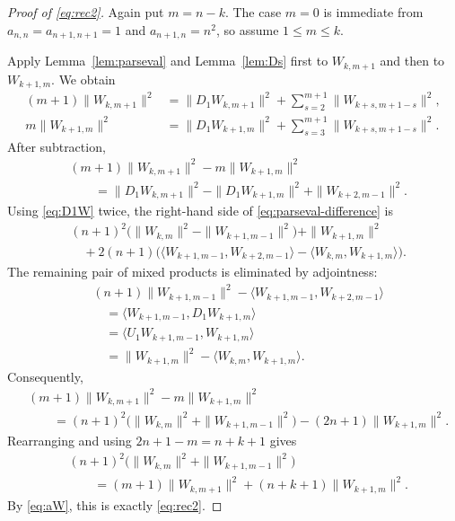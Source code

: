 \documentclass[a4paper,draft]{amsart}
\begin{document}
\begin{proof}[Proof of \eqref{eq:rec2}]
Again put $m=n-k$.  The case $m=0$ is immediate from
$a_{n,n}=a_{n+1,n+1}=1$ and $a_{n+1,n}=n^2$, so assume
$1\leq m\leq k$.

Apply Lemma~\ref{lem:parseval} and Lemma~\ref{lem:Ds} first to
$W_{k,m+1}$ and then to $W_{k+1,m}$.  We obtain
\begin{align*}
(m+1)\|W_{k,m+1}\|^2
 &=\|D_1W_{k,m+1}\|^2
   +\sum_{s=2}^{m+1}\|W_{k+s,m+1-s}\|^2,\\
m\|W_{k+1,m}\|^2
 &=\|D_1W_{k+1,m}\|^2
   +\sum_{s=3}^{m+1}\|W_{k+s,m+1-s}\|^2.
\end{align*}
After subtraction,
\begin{align}\label{eq:parseval-difference}
&(m+1)\|W_{k,m+1}\|^2-m\|W_{k+1,m}\|^2\nonumber\\
&\qquad=\|D_1W_{k,m+1}\|^2-\|D_1W_{k+1,m}\|^2
       +\|W_{k+2,m-1}\|^2.
\end{align}
Using \eqref{eq:D1W} twice, the right-hand side of
\eqref{eq:parseval-difference} is
\begin{align*}
&(n+1)^2\bigl(\|W_{k,m}\|^2-\|W_{k+1,m-1}\|^2\bigr)
 +\|W_{k+1,m}\|^2\\
&\quad+2(n+1)\bigl(
 \langle W_{k+1,m-1},W_{k+2,m-1}\rangle
 -\langle W_{k,m},W_{k+1,m}\rangle\bigr).
\end{align*}
The remaining pair of mixed products is eliminated by adjointness:
\begin{align*}
&(n+1)\|W_{k+1,m-1}\|^2
 -\langle W_{k+1,m-1},W_{k+2,m-1}\rangle\\
&\quad=\langle W_{k+1,m-1},D_1W_{k+1,m}\rangle\\
&\quad=\langle U_1W_{k+1,m-1},W_{k+1,m}\rangle\\
&\quad=\|W_{k+1,m}\|^2
 -\langle W_{k,m},W_{k+1,m}\rangle.
\end{align*}
Consequently,
\begin{align*}
&(m+1)\|W_{k,m+1}\|^2-m\|W_{k+1,m}\|^2\\
&\qquad=(n+1)^2\bigl(\|W_{k,m}\|^2
             +\|W_{k+1,m-1}\|^2\bigr)
       -(2n+1)\|W_{k+1,m}\|^2.
\end{align*}
Rearranging and using $2n+1-m=n+k+1$ gives
\begin{align*}
&(n+1)^2\bigl(\|W_{k,m}\|^2+\|W_{k+1,m-1}\|^2\bigr)\\
&\qquad=(m+1)\|W_{k,m+1}\|^2
 +(n+k+1)\|W_{k+1,m}\|^2.
\end{align*}
By \eqref{eq:aW}, this is exactly \eqref{eq:rec2}.
\end{proof}

\printbibliography
\end{document}
